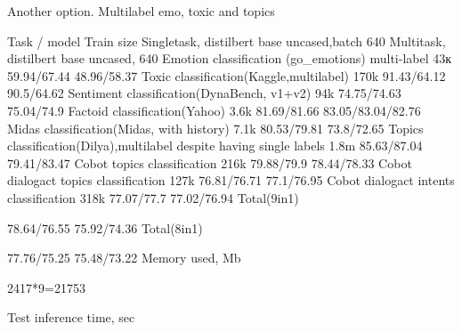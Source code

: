 Another option. Multilabel emo, toxic and topics


Task / model
Train size
Singletask, distilbert base uncased,batch 640
Multitask, distilbert base uncased, 640 
Emotion classification (go_emotions)
multi-label
43к
59.94/67.44
48.96/58.37
Toxic classification(Kaggle,multilabel)
170k
91.43/64.12
90.5/64.62
Sentiment classification(DynaBench, v1+v2)
94k
74.75/74.63
75.04/74.9
Factoid classification(Yahoo)
3.6k
81.69/81.66
83.05/83.04/82.76
Midas classification(Midas, with history)
7.1k
80.53/79.81
73.8/72.65
Topics classification(Dilya),multilabel despite having single labels
1.8m
85.63/87.04
79.41/83.47
Cobot topics classification
216k
79.88/79.9
78.44/78.33
Cobot dialogact topics classification
127k
76.81/76.71
77.1/76.95
Cobot dialogact intents classification
318k
77.07/77.7
77.02/76.94
Total(9in1)


78.64/76.55
75.92/74.36
Total(8in1)


77.76/75.25
75.48/73.22
Memory used, Mb


2417*9=21753


Test inference time, sec








